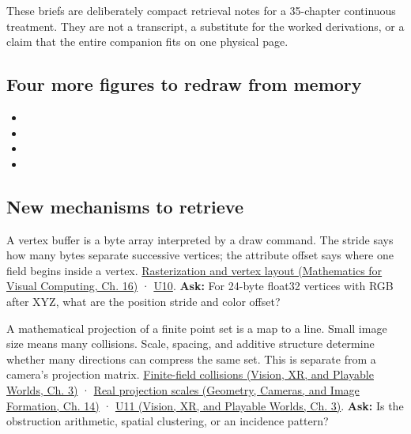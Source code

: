 These briefs are deliberately compact retrieval notes for a 35-chapter continuous treatment. They are not a transcript, a substitute for the worked derivations, or a claim that the entire companion fits on one physical page.

\subsection{Four more figures to redraw from memory}\label{appendix-a8f634b076b5-four-more-figures-to-redraw-from-memory}

\hypertarget{appendix-a8f634b076b5-four-more-figures-to-redraw-from-memory}{}

\begin{itemize}
\tightlist
\item
\item
\item
\item
\end{itemize}

\subsection{New mechanisms to retrieve}\label{appendix-a8f634b076b5-new-mechanisms-to-retrieve}

\hypertarget{appendix-a8f634b076b5-new-mechanisms-to-retrieve}{}

A vertex buffer is a byte array interpreted by a draw command. The stride says how many bytes separate successive vertices; the attribute offset says where one field begins inside a vertex. \href{../02-Mathematics-for-Visual-Computing/main.pdf\#nameddest=03-visual-computing-i-ch012-rasterization-coverage-and-depth}{Rasterization and vertex layout (Mathematics for Visual Computing, Ch. 16)} · \hyperref[03-visual-computing-i-ch018-figure-u10---vertex-fetch-uses-a-stride-and-byte-offset]{U10}. \textbf{Ask:} For 24-byte float32 vertices with RGB after XYZ, what are the position stride and color offset?

A mathematical projection of a finite point set is a map to a line. Small image size means many collisions. Scale, spacing, and additive structure determine whether many directions can compress the same set. This is separate from a camera's projection matrix. \href{../07-Vision-XR-and-Playable-Worlds/main.pdf\#nameddest=04-visual-computing-ii-ch032-finite-field-projections-turn-image-size-into-collision-counts}{Finite-field collisions (Vision, XR, and Playable Worlds, Ch. 3)} · \href{../03-Geometry-Cameras-and-Image-Formation/main.pdf\#nameddest=04-visual-computing-ii-ch033-real-projections-add-scale-spacing-and-incidence-geometry}{Real projection scales (Geometry, Cameras, and Image Formation, Ch. 14)} · \href{../07-Vision-XR-and-Playable-Worlds/main.pdf\#nameddest=04-visual-computing-ii-ch032-figure-u11---finite-grid-projections-expose-collision-counts}{U11 (Vision, XR, and Playable Worlds, Ch. 3)}. \textbf{Ask:} Is the obstruction arithmetic, spatial clustering, or an incidence pattern?

